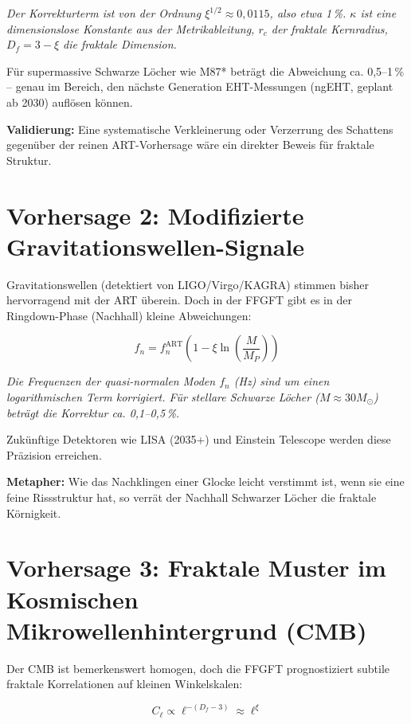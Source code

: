 	\textit{Der Korrekturterm ist von der Ordnung \(\xi^{1/2} \approx 0{,}0115\), also etwa 1\,\%. \(\kappa\) ist eine dimensionslose Konstante aus der Metrikableitung, \(r_c\) der fraktale Kernradius, \(D_f = 3 - \xi\) die fraktale Dimension.}
	
	Für supermassive Schwarze Löcher wie M87* beträgt die Abweichung ca. 0{,}5–1\,\% – genau im Bereich, den nächste Generation EHT-Messungen (ngEHT, geplant ab 2030) auflösen können.
	
	\textbf{Validierung:} Eine systematische Verkleinerung oder Verzerrung des Schattens gegenüber der reinen ART-Vorhersage wäre ein direkter Beweis für fraktale Struktur.
	
	\section{Vorhersage 2: Modifizierte Gravitationswellen-Signale}
	
	Gravitationswellen (detektiert von LIGO/Virgo/KAGRA) stimmen bisher hervorragend mit der ART überein. Doch in der FFGFT gibt es in der Ringdown-Phase (Nachhall) kleine Abweichungen:
	
	\begin{equation}
		f_n = f_n^{\text{ART}} \left(1 - \xi \ln\left(\frac{M}{M_P}\right)\right)
	\end{equation}
	
	\textit{Die Frequenzen der quasi-normalen Moden \(f_n\) (Hz) sind um einen logarithmischen Term korrigiert. Für stellare Schwarze Löcher (\(M \approx 30 M_\odot\)) beträgt die Korrektur ca. 0{,}1–0{,}5\,\%.}
	
	Zukünftige Detektoren wie LISA (2035+) und Einstein Telescope werden diese Präzision erreichen.
	
	\textbf{Metapher:} Wie das Nachklingen einer Glocke leicht verstimmt ist, wenn sie eine feine Rissstruktur hat, so verrät der Nachhall Schwarzer Löcher die fraktale Körnigkeit.
	
	\section{Vorhersage 3: Fraktale Muster im Kosmischen Mikrowellenhintergrund (CMB)}
	
	Der CMB ist bemerkenswert homogen, doch die FFGFT prognostiziert subtile fraktale Korrelationen auf kleinen Winkelskalen:
	
	\begin{equation}
		C_\ell \propto \ell^{-(D_f - 3)} \approx \ell^{\xi}
	\end{equation}
	

